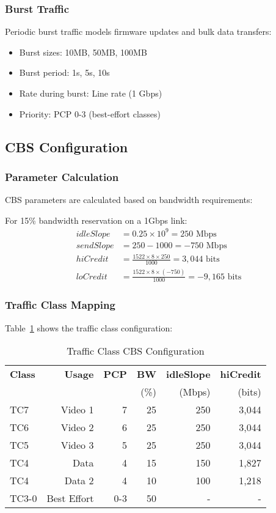 \documentclass[10pt, journal, compsoc]{IEEEtran}
\begin{document}
\subsubsection{Burst Traffic}

Periodic burst traffic models firmware updates and bulk data transfers:

\begin{itemize}
    \item Burst sizes: 10MB, 50MB, 100MB
    \item Burst period: 1s, 5s, 10s
    \item Rate during burst: Line rate (1 Gbps)
    \item Priority: PCP 0-3 (best-effort classes)
\end{itemize}

\subsection{CBS Configuration}

\subsubsection{Parameter Calculation}

CBS parameters are calculated based on bandwidth requirements:

For 15\% bandwidth reservation on a 1Gbps link:
\begin{align}
idleSlope &= 0.25 \times 10^9 = 250 \text{ Mbps} \\
sendSlope &= 250 - 1000 = -750 \text{ Mbps} \\
hiCredit &= \frac{1522 \times 8 \times 250}{1000} = 3,044 \text{ bits} \\
loCredit &= \frac{1522 \times 8 \times (-750)}{1000} = -9,165 \text{ bits}
\end{align}

\subsubsection{Traffic Class Mapping}

Table~\ref{tab:tc_mapping} shows the traffic class configuration:

\begin{table}[h]
\centering
\caption{Traffic Class CBS Configuration}
\label{tab:tc_mapping}
\begin{tabular}{lrrrrr}
\toprule
\textbf{Class} & \textbf{Usage} & \textbf{PCP} & \textbf{BW} & \textbf{idleSlope} & \textbf{hiCredit} \\
 & & & (\%) & (Mbps) & (bits) \\
\midrule
TC7 & Video 1 & 7 & 25 & 250 & 3,044 \\
TC6 & Video 2 & 6 & 25 & 250 & 3,044 \\
TC5 & Video 3 & 5 & 25 & 250 & 3,044 \\
TC4 & Data & 4 & 15 & 150 & 1,827 \\
TC4 & Data 2 & 4 & 10 & 100 & 1,218 \\
TC3-0 & Best Effort & 0-3 & 50 & - & - \\
\bottomrule
\end{tabular}
\end{table}
\end{document}
